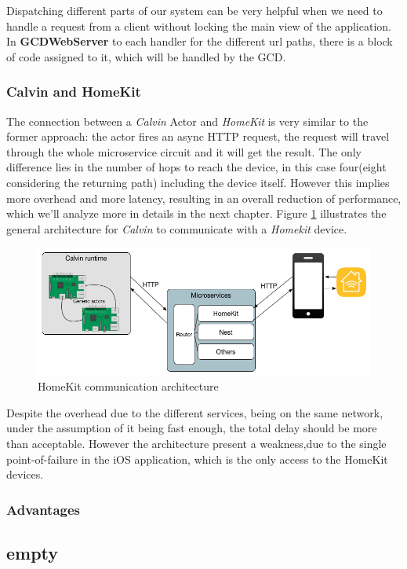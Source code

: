 Dispatching different parts of our system can be very helpful when we need to handle
a request from a client without locking the main view of the application. In \textbf{GCDWebServer}
to each handler for the different url paths, there is a block of code assigned to it,
which will be handled by the GCD.


\subsubsection{Calvin and HomeKit}

The connection between a \textit{Calvin} Actor and \textit{HomeKit} is very similar
to the former approach: the actor fires an async HTTP request, the request will travel
through the whole microservice circuit and it will get the result. \newline
The only difference lies in the number of hops to reach the device, in this case
four(eight considering the returning path) including the device itself. However this
implies more overhead and more latency, resulting in an overall reduction of performance,
which we'll analyze more in details in the next chapter.
Figure \ref{fig:arch-homekit} illustrates the general architecture for \textit{Calvin}
to communicate with a \textit{Homekit} device.
\begin{figure}[h]
\caption{HomeKit communication architecture}
\label{fig:arch-homekit}
\centering
\includegraphics[scale=0.5]{arch2.png}
\end{figure}

Despite the overhead due to the different services, being on the same network, under the
assumption of it being fast enough, the total delay should be more than acceptable.
However the architecture present a weakness,due to the single point-of-failure in the
iOS application, which is the only access to the HomeKit devices.



\subsubsection{Advantages}











\subsection{empty}
